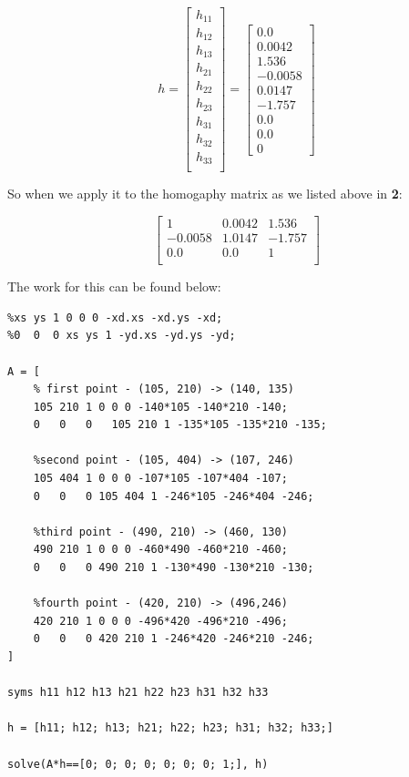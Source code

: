 \documentclass{article}
\begin{document}
\begin{equation}
    h = \begin{bmatrix}
        h_{11} \\
        h_{12} \\
        h_{13} \\
        h_{21} \\
        h_{22} \\
        h_{23} \\
        h_{31} \\
        h_{32} \\
        h_{33} \\
    \end{bmatrix} = \begin{bmatrix}
        0.0 \\
        0.0042 \\
        1.536 \\
        -0.0058 \\
        0.0147 \\
        -1.757 \\
        0.0 \\
        0.0 \\
        0
    \end{bmatrix}
\end{equation}

So when we apply it to the homogaphy matrix as we listed above in \textbf{2}:

\begin{equation}
    \begin{bmatrix}
        1 & 0.0042 & 1.536 \\
        -0.0058 & 1.0147 & -1.757 \\
        0.0 & 0.0 & 1\\
    \end{bmatrix}
\end{equation}

The work for this can be found below:

\begin{verbatim}
%xs ys 1 0 0 0 -xd.xs -xd.ys -xd;
%0  0  0 xs ys 1 -yd.xs -yd.ys -yd;

A = [
    % first point - (105, 210) -> (140, 135)
    105 210 1 0 0 0 -140*105 -140*210 -140;
    0   0   0   105 210 1 -135*105 -135*210 -135;

    %second point - (105, 404) -> (107, 246)
    105 404 1 0 0 0 -107*105 -107*404 -107;
    0   0   0 105 404 1 -246*105 -246*404 -246;

    %third point - (490, 210) -> (460, 130)
    490 210 1 0 0 0 -460*490 -460*210 -460;
    0   0   0 490 210 1 -130*490 -130*210 -130;

    %fourth point - (420, 210) -> (496,246)
    420 210 1 0 0 0 -496*420 -496*210 -496;
    0   0   0 420 210 1 -246*420 -246*210 -246;
]

syms h11 h12 h13 h21 h22 h23 h31 h32 h33

h = [h11; h12; h13; h21; h22; h23; h31; h32; h33;]

solve(A*h==[0; 0; 0; 0; 0; 0; 0; 1;], h)
  
\end{verbatim}
\end{document}
